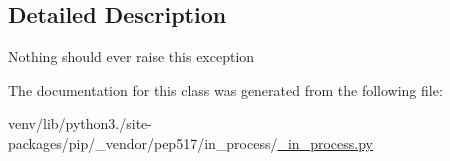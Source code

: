 \subsection{Detailed Description}
\begin{DoxyVerb}Nothing should ever raise this exception\end{DoxyVerb}
 

The documentation for this class was generated from the following file\+:\begin{DoxyCompactItemize}
\item 
venv/lib/python3./site-\/packages/pip/\+\_\+vendor/pep517/in\+\_\+process/\hyperlink{__in__process_8py}{\+\_\+in\+\_\+process.\+py}\end{DoxyCompactItemize}

